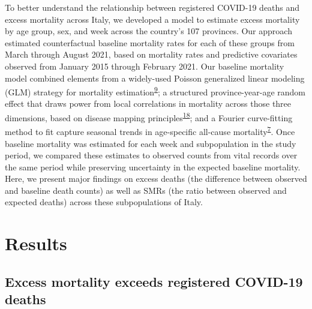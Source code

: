 \documentclass[
]{article}
\begin{document}
To better understand the relationship between registered COVID-19 deaths and excess mortality across Italy, we developed a model to estimate excess mortality by age group, sex, and week across the country's 107 provinces. Our approach estimated counterfactual baseline mortality rates for each of these groups from March through August 2021, based on mortality rates and predictive covariates observed from January 2015 through February 2021. Our baseline mortality model combined elements from a widely-used Poisson generalized linear modeling (GLM) strategy for mortality estimation\textsuperscript{\protect\hyperlink{ref-Noufaily2013}{9}}⁠; a structured province-year-age random effect that draws power from local correlations in mortality across those three dimensions, based on disease mapping principles\textsuperscript{\protect\hyperlink{ref-Banerjee2014}{18}}⁠; and a Fourier curve-fitting method to fit capture seasonal trends in age-specific all-cause mortality\textsuperscript{\protect\hyperlink{ref-Serfling1963}{7}}⁠. Once baseline mortality was estimated for each week and subpopulation in the study period, we compared these estimates to observed counts from vital records over the same period while preserving uncertainty in the expected baseline mortality. Here, we present major findings on excess deaths (the difference between observed and baseline death counts) as well as SMRs (the ratio between observed and expected deaths) across these subpopulations of Italy.

\hypertarget{results}{%
\section{Results}\label{results}}

\hypertarget{excess-mortality-exceeds-registered-covid-19-deaths}{%
\subsection{Excess mortality exceeds registered COVID-19 deaths}\label{excess-mortality-exceeds-registered-covid-19-deaths}}
\end{document}

